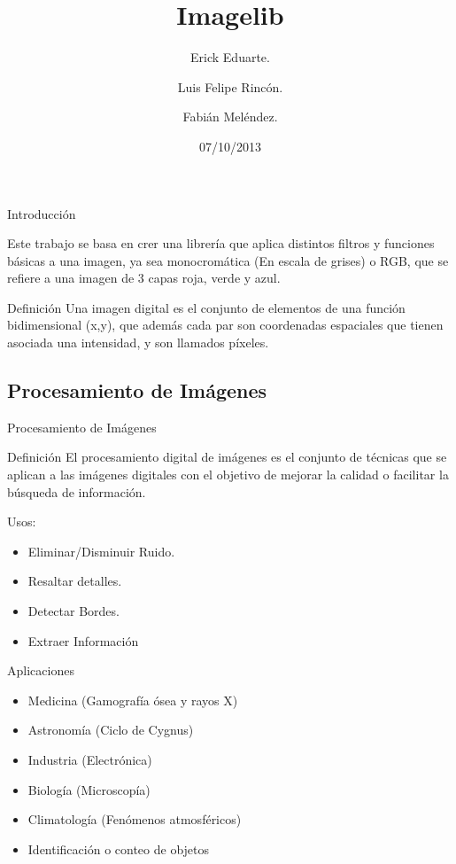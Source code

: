 \documentclass{beamer}
\title[Imagelib \hspace{25mm} \insertframenumber/\inserttotalframenumber]{Imagelib}
\author{Erick Eduarte. \and  Luis Felipe Rincón. \and Fabián Meléndez.}
\institute{Universidad de Costa Rica}
\date{07/10/2013}
\begin{document}
\begin{frame}
  \titlepage
\end{frame}




\begin{frame}{Introducción}

Este trabajo se basa en crer una librería que aplica distintos filtros y funciones básicas a una imagen, ya sea monocromática (En escala de grises) o RGB, que se refiere a una imagen de 3 capas roja, verde y azul.


  \begin{block}{Definición}
  \justifying
 Una imagen digital es el conjunto de elementos de una función bidimensional (x,y), que además cada par son coordenadas espaciales que tienen asociada una intensidad, y son llamados píxeles.
 \end{block}


\end{frame}

\subsection{Procesamiento de Imágenes}



\begin{frame}{Procesamiento de Imágenes}

  \begin{block}{Definición}
  \justifying
  El procesamiento digital de imágenes es el conjunto de técnicas que se aplican a las imágenes digitales con el objetivo de mejorar la calidad o facilitar la búsqueda de información.
  \end{block}
  

\large{Usos:}
\begin{itemize}

\item Eliminar/Disminuir Ruido.
\item Resaltar detalles.
\item Detectar Bordes.
\item Extraer Información

\end{itemize}

\end{frame}


\begin{frame}{Aplicaciones}

\begin{itemize}

\item Medicina (Gamografía ósea y rayos X)
\item Astronomía (Ciclo de Cygnus)
\item Industria (Electrónica)
\item Biología (Microscopía)
\item Climatología (Fenómenos atmosféricos)
\item Identificación o conteo de objetos

\end{itemize}

\end{frame}
\end{document}
